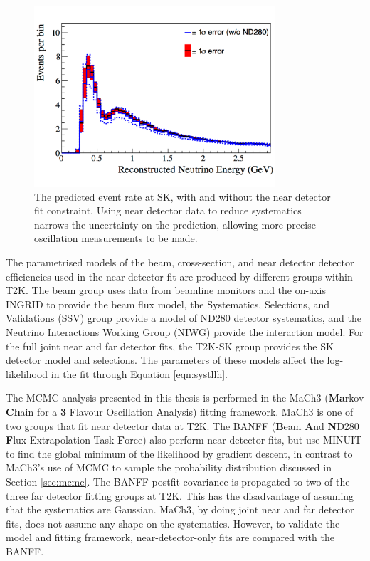 \begin{figure}[!htbp]
\centering
\includegraphics*[width=0.8\textwidth,clip]{figs/NDConstraint}
\caption{The predicted event rate at SK, with and without the near detector fit constraint. Using near detector data to reduce systematics narrows the uncertainty on the prediction, allowing more precise oscillation measurements to be made.}\label{fig:ndconstraint}
\end{figure}

The parametrised models of the beam, cross-section, and near detector detector efficiencies used in the near detector fit are produced by different groups within T2K. The beam group uses data from beamline monitors and the on-axis INGRID to provide the beam flux model, the Systematics, Selections, and Validations (SSV) group provide a model of ND280 detector systematics, and the Neutrino Interactions Working Group (NIWG) provide the interaction model. For the full joint near and far detector fits, the T2K-SK group provides the SK detector model and selections. The parameters of these models affect the log-likelihood in the fit through Equation \ref{eqn:systllh}.

The MCMC analysis presented in this thesis is performed in the MaCh3 (\textbf{Ma}rkov \textbf{Ch}ain for a \textbf{3} Flavour Oscillation Analysis) fitting framework. MaCh3 is one of two groups that fit near detector data at T2K. The BANFF (\textbf{B}eam \textbf{A}nd \textbf{N}D280 \textbf{F}lux Extrapolation Task \textbf{F}orce) also perform near detector fits, but use MINUIT\cite{minuit} to find the global minimum of the likelihood by gradient descent, in contrast to MaCh3's use of MCMC to sample the probability distribution discussed in Section \ref{sec:mcmc}. The BANFF postfit covariance is propagated to two of the three far detector fitting groups at T2K. This has the disadvantage of assuming that the systematics are Gaussian. MaCh3, by doing joint near and far detector fits, does not assume any shape on the systematics. However, to validate the model and fitting framework, near-detector-only fits are compared with the BANFF.

